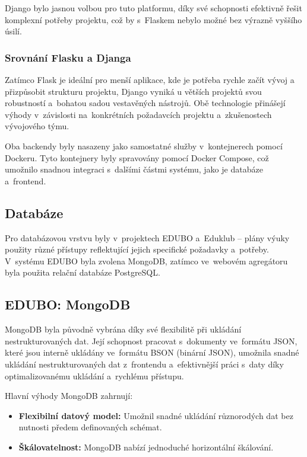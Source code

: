 \documentclass[male,czech,api_bc]{kitheses}
\begin{document}
Django bylo jasnou volbou pro tuto platformu, díky své schopnosti efektivně řešit komplexní potřeby projektu, což by s~Flaskem nebylo možné bez výrazně vyššího úsilí.

\subsubsection{Srovnání Flasku a Djanga}

Zatímco Flask je ideální pro menší aplikace, kde je potřeba rychle začít vývoj a přizpůsobit strukturu projektu, Django vyniká u větších projektů svou robustností a~bohatou sadou vestavěných nástrojů. Obě technologie přinášejí výhody v~závislosti na~konkrétních požadavcích projektu a~zkušenostech vývojového týmu.

Oba backendy byly nasazeny jako samostatné služby v~kontejnerech pomocí Dockeru. Tyto kontejnery byly spravovány pomocí Docker Compose, což umožnilo snadnou integraci s~dalšími částmi systému, jako je databáze a~frontend.

\subsection{Databáze}

Pro databázovou vrstvu byly v~projektech EDUBO a~Eduklub – plány výuky použity různé přístupy reflektující jejich specifické požadavky a~potřeby. V~systému EDUBO byla zvolena MongoDB, zatímco ve~webovém agregátoru byla použita relační databáze PostgreSQL.

\subsection{EDUBO: MongoDB}

MongoDB byla původně vybrána díky své flexibilitě při ukládání nestrukturovaných dat. Její schopnost pracovat s~dokumenty ve~formátu JSON, které jsou interně ukládány ve~formátu BSON (binární JSON), umožnila snadné ukládání nestrukturovaných dat z~frontendu a~efektivnější práci s~daty díky optimalizovanému ukládání a~rychlému přístupu.

Hlavní výhody MongoDB zahrnují:
\begin{itemize}
	\item \textbf{Flexibilní datový model:} Umožnil snadné ukládání různorodých dat bez nutnosti předem definovaných schémat.
	\item \textbf{Škálovatelnost:} MongoDB nabízí jednoduché horizontální škálování.
\end{itemize}
\end{document}
